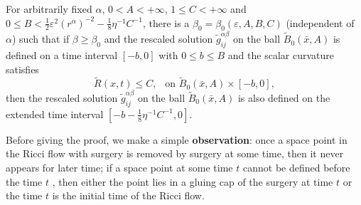 \begin{lemma}
  \label{lem:cz-rescaled-ball-backward-extension}
For arbitrarily fixed $\alpha$,
$0<A<+\infty$,  $1 \leq C<+\infty$ and $0 \leq B <
\frac{1}{2}\varepsilon^2(r^{\alpha})^{-2}-
\frac{1}{8}\eta^{-1}C^{-1}$, there is a
$\beta_0=\beta_0(\varepsilon, A, B, C)$ (independent of $\alpha$)
such that if $\beta\geq\beta_0$ and the rescaled solution
$\widetilde{g}^{\alpha\beta}_{ij}$ on the ball
$\widetilde{B}_{0}(\bar{x},A)$ is defined on a time interval
$[-b,0]$ with $0 \leq b \leq B$ and the scalar curvature satisfies
$$\widetilde{R}(x,t)\leq C , \ \ \mbox{ on }
\widetilde{B}_{0}(\bar{x},A) \times [-b,0],$$ then the rescaled
solution $\widetilde{g}^{\alpha\beta}_{ij}$ on the ball
$\widetilde{B}_{0}(\bar{x},A)$ is also defined on the extended
time interval $ [-b-\frac{1}{8}\eta^{-1}C^{-1},0]$.

\medskip
Before giving the proof, we make a simple \textbf{observation}:
once a space point in the Ricci flow with surgery is removed by
surgery at some time, then it never appears for later time; if a
space point at some time $t$ cannot be defined before the time $t$
, then either the point lies in a gluing cap of the surgery at
time $t$ or the time $t$ is the initial time of the Ricci flow.
\end{lemma}
